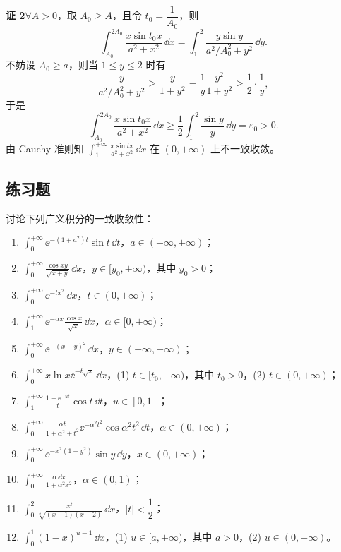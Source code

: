 \textbf{证 2}\quad $\forall A>0$，取 $A_0\geqslant A$，且令 $t_0=\dfrac1{A_0}$，则
\[
  \int_{A_0}^{2A_0}\frac{x\sin t_0x}{a^2+x^2}\,\dd x
  =\int_1^2\frac{y\sin y}{a^2/A_0^2+y^2}\,\dd y.
\]
不妨设 $A_0\geqslant a$，则当 $1\leqslant y\leqslant2$ 时有
\[
  \frac{y}{a^2/A_0^2+y^2}\geqslant\frac{y}{1+y^2}=\frac1y\frac{y^2}{1+y^2}\geqslant\frac12\cdot\frac1y,
\]
于是
\[
  \int_{A_0}^{2A_0}\frac{x\sin t_0x}{a^2+x^2}\,\dd x
  \geqslant\frac12\int_1^2\frac{\sin y}{y}\,\dd y=\varepsilon_0>0.
\]
由 Cauchy 准则知 $\displaystyle\int_1^{+\infty}\frac{x\sin tx}{a^2+x^2}\,\dd x$ 在 $(0,+\infty)$ 上不一致收敛。

\subsection{练习题}
\begin{xexercise}[1]
讨论下列广义积分的一致收敛性：
  \begin{enumerate}[label=(\arabic*)]
    \item $\displaystyle\int_0^{+\infty}\ee^{-(1+a^2)t}\sin t\,\dd t$，$a\in(-\infty,+\infty)$；
    \item $\displaystyle\int_0^{+\infty}\frac{\cos xy}{\sqrt{x+y}}\,\dd x$，$y\in[y_0,+\infty)$，其中 $y_0>0$；
    \item $\displaystyle\int_0^{+\infty}\ee^{-tx^2}\,\dd x$，$t\in(0,+\infty)$；
    \item $\displaystyle\int_1^{+\infty}\ee^{-\alpha x}\frac{\cos x}{\sqrt{x}}\,\dd x$，$\alpha\in[0,+\infty)$；
    \item $\displaystyle\int_0^{+\infty}\ee^{-(x-y)^2}\,\dd x$，$y\in(-\infty,+\infty)$；
    \item $\displaystyle\int_0^{+\infty}x\ln x\ee^{-t\sqrt{x}}\,\dd x$，(1) $t\in[t_0,+\infty)$，其中 $t_0>0$，(2) $t\in(0,+\infty)$；
    \item $\displaystyle\int_1^{+\infty}\frac{1-\ee^{-ut}}{t}\cos t\,\dd t$，$u\in[0,1]$；
    \item $\displaystyle\int_0^{+\infty}\frac{\alpha t}{1+\alpha^2+t^2}\ee^{-\alpha^2t^2}\cos\alpha^2t^2\,\dd t$，$\alpha\in(0,+\infty)$；
    \item $\displaystyle\int_0^{+\infty}\ee^{-x^2(1+y^2)}\sin y\,\dd y$，$x\in(0,+\infty)$；
    \item $\displaystyle\int_0^{+\infty}\frac{\alpha\,\dd x}{1+\alpha^2x^2}$，$\alpha\in(0,1)$；
    \item $\displaystyle\int_0^2\frac{x^t}{\sqrt[3]{(x-1)(x-2)}}\,\dd x$，$|t|<\dfrac12$；
    \item $\displaystyle\int_0^1(1-x)^{u-1}\,\dd x$，(1) $u\in[a,+\infty)$，其中 $a>0$，(2) $u\in(0,+\infty)$。
  \end{enumerate}
\end{xexercise}
